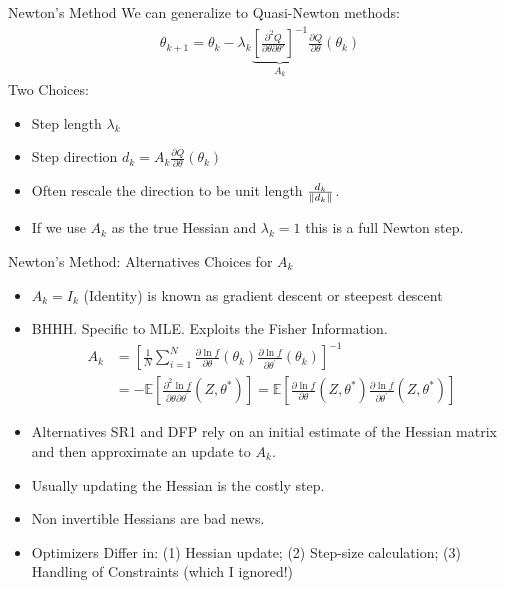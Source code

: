 \begin{frame}{Newton's Method}
We can generalize to Quasi-Newton methods:
\begin{align*}
\theta_{k+1} = \theta_k -  \lambda_k \underbrace{\left[ \frac{\partial^2 Q}{\partial \theta \partial \theta'} \right]^{-1}}_{A_k} \frac{\partial Q}{\partial \theta}(\theta_k)
\end{align*}
Two Choices:
\begin{itemize}
\item Step length $\lambda_k$
\item Step direction $d_k=A_k \frac{\partial Q}{\partial \theta}(\theta_k)$
\item Often rescale the direction to be unit length $\frac{d_k}{\lVert d_k\rVert}$.
\item If we use $A_k$ as the true Hessian and $\lambda_k=1$ this is a \alert{full Newton step}.
\end{itemize}
\end{frame}

\begin{frame}{Newton's Method: Alternatives}
Choices for $A_k$
\begin{itemize}
\item $A_k= I_{k}$ (Identity) is known as \alert{gradient descent} or \alert{steepest descent}
\item BHHH. Specific to MLE. Exploits the \alert{Fisher Information}.
\begin{align*}
A _ { k } 
&= \left[ \frac { 1 } { N } \sum _ { i = 1 } ^ { N } \frac { \partial \ln f } { \partial \theta } \left( \theta _ { k } \right) \frac { \partial \ln f } { \partial \theta ^ { \prime } } \left( \theta _ { k } \right) \right] ^ { - 1 }\\
&=- \mathbb { E } \left[ \frac { \partial ^ { 2 } \ln f } { \partial \theta \partial \theta ^ { \prime } } \left( Z , \theta ^ { * } \right) \right] 
= \mathbb { E } \left[ \frac { \partial \ln f } { \partial \theta } \left( Z , \theta ^ { * } \right) \frac { \partial \ln f } { \partial \theta ^ { \prime } } \left( Z , \theta ^ { * } \right) \right]
\end{align*}
\item Alternatives \alert{SR1} and \alert{DFP} rely on an initial estimate of the Hessian matrix and then approximate an update to $A_k$.
\item Usually updating the Hessian is the costly step.
\item Non invertible Hessians are bad news.
\item Optimizers Differ in: (1) Hessian update; (2) Step-size calculation; (3) Handling of Constraints (which I ignored!)
\end{itemize}
\end{frame}

